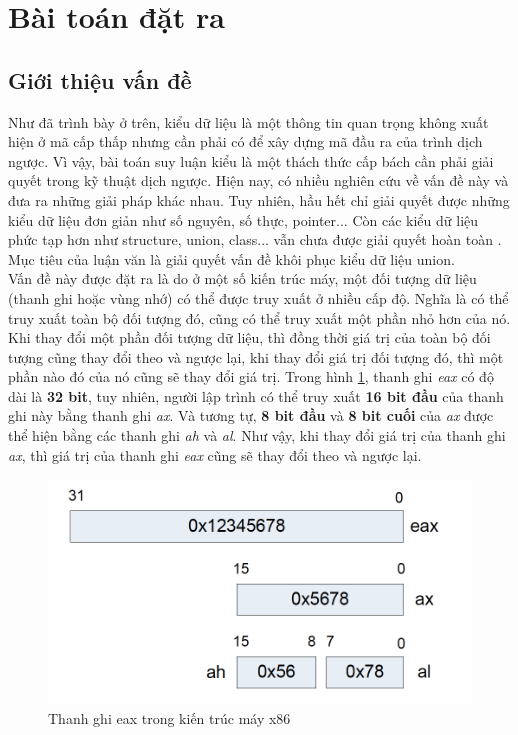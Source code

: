 \section{Bài toán đặt ra}
\label{sec:problem}
\subsection{Giới thiệu vấn đề}
Như đã trình bày ở trên, kiểu dữ liệu là một thông tin quan trọng không xuất hiện ở mã cấp thấp nhưng cần phải có để xây dựng mã đầu ra của trình dịch ngược. Vì vậy, bài toán suy luận kiểu là một thách thức cấp bách cần phải giải quyết trong kỹ thuật dịch ngược. Hiện nay, có nhiều nghiên cứu về vấn đề này và đưa ra những giải pháp khác nhau. Tuy nhiên, hầu hết chỉ giải quyết được những kiểu dữ liệu đơn giản như số nguyên, số thực, pointer... Còn các kiểu dữ liệu phức tạp hơn như structure, union, class... vẫn chưa được giải quyết hoàn toàn \cite{ssavan}. Mục tiêu của luận văn là giải quyết vấn đề khôi phục kiểu dữ liệu union. \\

Vấn đề này được đặt ra là do ở một số kiến trúc máy, một đối tượng dữ liệu (thanh ghi hoặc vùng nhớ) có thể được truy xuất ở nhiều cấp độ. Nghĩa là có thể truy xuất toàn bộ đối tượng đó, cũng có thể truy xuất một phần nhỏ hơn của nó. Khi thay đổi một phần đối tượng dữ liệu, thì đồng thời giá trị của toàn bộ đối tượng cũng thay đổi theo và ngược lại, khi thay đổi giá trị đối tượng đó, thì một phần nào đó của nó cũng sẽ thay đổi giá trị. Trong hình \ref{fig:eax}, thanh ghi \textit{eax} có độ dài là \textbf{32 bit}, tuy nhiên, người lập trình có thể truy xuất \textbf{16 bit đầu} của thanh ghi này bằng thanh ghi \textit{ax}. Và tương tự, \textbf{8 bit đầu} và \textbf{8 bit cuối} của \textit{ax} được thể hiện bằng các thanh ghi \textit{ah} và \textit{al}. Như vậy, khi thay đổi giá trị của thanh ghi \textit{ax}, thì giá trị của thanh ghi \textit{eax} cũng sẽ thay đổi theo và ngược lại.\\
\begin{figure}[h]
	\centering
	\includegraphics[width=0.7\linewidth]{image/eax}
	\caption{Thanh ghi eax trong kiến trúc máy x86}
	\label{fig:eax}
\end{figure}

